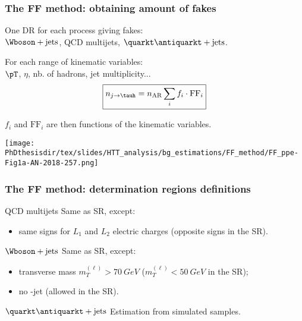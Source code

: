 \begin{frame}
\frametitle{The FF method: obtaining amount of fakes}

\begin{minipage}[c]{.45\textwidth}
\manip One DR for each process giving fakes:\\$\Wboson+\text{jets}$, QCD multijets, $\quarkt\antiquarkt+\text{jets}$.

\manip For each range of kinematic variables:\\
\qquad $\pT$, $\eta$, nb. of hadrons, jet multiplicity...
\begin{equation*}
\boxed{n_{j\to\tauh} = n_\text{AR}\sum_i f_i \cdot \mathrm{FF}_i}
\end{equation*}

\manip $f_i$ and $\mathrm{FF}_i$ are then functions of the kinematic variables.
\end{minipage}
\hfill
\begin{minipage}[c]{.45\textwidth}
\begin{center}
\texttt{[image: \\PhDthesisdir/tex/slides/HTT\_analysis/bg\_estimations/FF\_method/FF\_ppe-Fig1a-AN-2018-257.png]}
\end{center}
\end{minipage}
\end{frame}

\begin{frame}
\frametitle{The FF method: determination regions definitions}

\begin{block}{QCD multijets}
Same as SR, except:
\begin{itemize}
\item same signs for $L_1$ and $L_2$ electric charges (opposite signs in the SR).
\end{itemize}
\end{block}

\pause\vfill

\begin{block}{$\Wboson+\text{jets}$}
Same as SR, except:
\begin{itemize}
\item transverse mass $m_T^{(\ell)}>\SI{70}{GeV}$ ($m_T^{(\ell)}<\SI{50}{GeV}$ in the SR);
\item no \quarkb-jet (allowed in the SR).
\end{itemize}
\end{block}

\pause\vfill

\begin{block}{$\quarkt\antiquarkt+\text{jets}$}
Estimation from simulated samples.
\end{block}

\end{frame}


